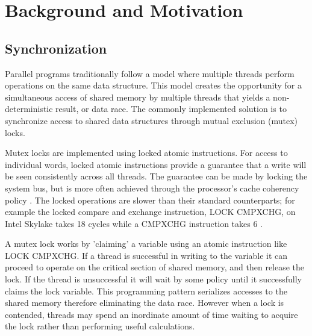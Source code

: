 \documentclass{uicthesi}
\begin{document}
\chapter{Background and Motivation}
\section{Synchronization}
Parallel programs traditionally follow a model where multiple threads perform operations on the same data structure. This model creates the opportunity for a simultaneous access of shared memory by multiple threads that yields a non-deterministic result, or data race. The commonly implemented solution is to synchronize access to shared data structures through mutual exclusion (mutex) locks. 

Mutex locks are implemented using locked atomic instructions. For access to individual words, locked atomic instructions provide a guarantee that a write will be seen consistently across all threads. The guarantee can be made by locking the system bus, but is more often achieved through the processor's cache coherency policy \cite{IntelDevelopersManual}. The locked operations are slower than their standard counterparts; for example the locked compare and exchange instruction, LOCK CMPXCHG, on Intel Skylake takes 18 cycles while a CMPXCHG  instruction takes 6 \cite{agner}. 

A mutex lock works by 'claiming' a variable using an atomic instruction like LOCK CMPXCHG. If a thread is successful in writing to the variable it can proceed to operate on the critical section of shared memory, and then release the lock. If the thread is unsuccessful it will wait by some policy until it successfully claims the lock variable. This programming pattern serializes accesses to the shared memory therefore eliminating the data race. However when a lock is contended, threads may spend an inordinate amount of time waiting to acquire the lock rather than performing useful calculations. 
\end{document}
